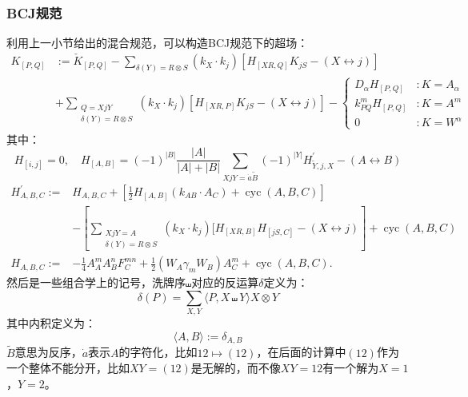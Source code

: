 \subsubsection{BCJ规范}
利用上一小节给出的混合规范，可以构造BCJ规范下的超场：
\begin{equation}
	\begin{aligned}
		K_{[P,Q]}&:=\check{K}_{[P,Q]}-\sum_{\delta(Y)=R\otimes S}(k_X\cdot k_j)\left[H_{[XR,Q]}K_{jS}-(X\leftrightarrow j)\right]\\&+\sum_{\substack{  {Q}=  {X}j  {Y}\\{{\delta(Y)=R\otimes S}}}}(k_X\cdot k_j)\left[H_{[XR,P]}K_{jS}-(X\leftrightarrow j)\right]-\begin{cases}D_\alpha H_{[P,  {Q}]}&:K=A_\alpha\\k_{{  {P}  {Q}}}^mH_{[P,  {Q}]}&:K=A^m\\0&:K=W^\alpha\end{cases}
	\end{aligned}
\end{equation}
其中：
\begin{equation}
	H_{[i,j]}=0,\quad H_{[A,B]}=(-1)^{|B|}\frac{|A|}{|A|+|B|}\sum_{XjY=\dot{a}\tilde{B}}(-1)^{|Y|}H_{\tilde{Y},j,X}^{\prime}-(A\leftrightarrow B)
\end{equation}
\begin{equation}
	\begin{aligned}
		H_{A,B,C}^{\prime}:=&H_{A,B,C}+\left[\frac{1}{2}H_{[A,B]}(k_{AB}\cdot A_C)+\operatorname{cyc}(A,B,C)\right]\\&-\left[\sum_{\substack{XjY=A\\{\delta(Y)=R\otimes S}}}(k_X\cdot k_j)[H_{[XR,B]}H_{[jS,C]}-(X\leftrightarrow j)\right]+\operatorname{cyc}(A,B,C)
		\\H_{A,B,C}:=&-\frac{1}{4}A_A^mA_B^nF_C^{mn}+\frac{1}{2}(W_A\gamma_mW_B)A_C^m+\operatorname{cyc}(A,B,C).\end{aligned}
\end{equation}
然后是一些组合学上的记号，洗牌序$\shuffle$对应的反运算$\delta$定义为：
\begin{equation}
	\delta(P)=\sum_{X,Y}\langle P,X\shuffle Y\rangle X\otimes Y
\end{equation}
其中内积定义为：
\begin{equation}
	\langle{A,B}\rangle:=\delta_{A,B}
\end{equation}
$\tilde B$意思为反序，$\dot a$表示$A$的字符化，比如$12\mapsto (12)$，在后面的计算中$(12)$作为一个整体不能分开，比如$XY=(12)$是无解的，而不像$XY=12$有一个解为$X=1$，$Y=2$。

